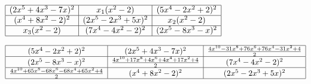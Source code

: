 \begin{center}
$\begin{array}{ |c|c|c| } 
\hline
(2x^5 + 4x^3 - 7x)^2 & x_1(x^2 - 2) & (5x^4 - 2x^2 + 2)^2 \\ 
\hline
(x^4 + 8x^2 - 2)^2 & (2x^5 - 2x^3 + 5x)^2 & x_2(x^2 - 2) \\ 
\hline
x_3(x^2 - 2) & (7x^4 - 4x^2 - 2)^2 & (2x^5 - 8x^3 - x)^2 \\
\hline
\end{array}$
\end{center}
\begin{center}
$\begin{array}{ |c|c|c| } 
\hline
(5x^4 - 2x^2 + 2)^2 & (2x^5 + 4x^3 - 7x)^2 & \frac{4x^{10} - 31x^8 + 76x^6 + 76x^4 - 31x^2 + 4}{2}\\ 
\hline
(2x^5 - 8x^3 - x)^2 & \frac{4x^{10} + 17x^8 + 4x^6 + 4x^4 + 17x^2 + 4}{2} & (7x^4 - 4x^2 - 2)^2 \\ 
\hline
\frac{4x^{10} + 65x^8 - 68x^6 - 68x^4 + 65x^2 + 4}{2} & (x^4 + 8x^2 - 2)^2 & (2x^5 - 2x^3 + 5x)^2 \\
\hline
\end{array}$
\end{center}

